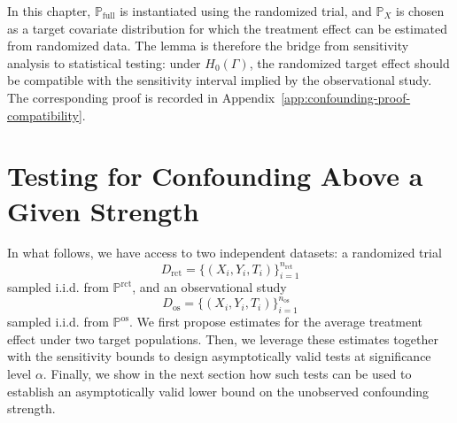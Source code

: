 In this chapter, \(\mathbb{P}_{\mathrm{full}}\) is instantiated using the randomized trial, and \(\mathbb{P}_X\) is chosen as a target covariate distribution for which the treatment effect can be estimated from randomized data. The lemma is therefore the bridge from sensitivity analysis to statistical testing: under \(H_0(\Gamma)\), the randomized target effect should be compatible with the sensitivity interval implied by the observational study. The corresponding proof is recorded in Appendix~\ref{app:confounding-proof-compatibility}.

\section{Testing for Confounding Above a Given Strength}
\label{sec:confounding-methodology}

In what follows, we have access to two independent datasets: a randomized trial
\[
  D_{\mathrm{rct}}
  =
  \{(X_i,Y_i,T_i)\}_{i=1}^{n_{\mathrm{rct}}}
\]
sampled i.i.d. from \(\mathbb{P}^{\mathrm{rct}}\), and an observational study
\[
  D_{\mathrm{os}}
  =
  \{(X_i,Y_i,T_i)\}_{i=1}^{n_{\mathrm{os}}}
\]
sampled i.i.d. from \(\mathbb{P}^{\mathrm{os}}\). We first propose estimates for the average treatment effect under two target populations. Then, we leverage these estimates together with the sensitivity bounds to design asymptotically valid tests at significance level \(\alpha\). Finally, we show in the next section how such tests can be used to establish an asymptotically valid lower bound on the unobserved confounding strength.

